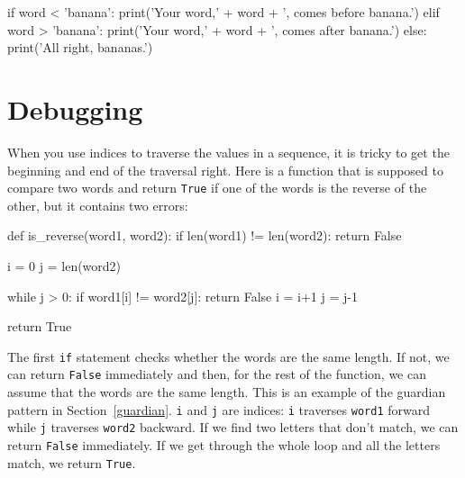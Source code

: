 \beforeverb
\begin{pycode}
if word < 'banana':
    print('Your word,' + word + ', comes before banana.')
elif word > 'banana':
    print('Your word,' + word + ', comes after banana.')
else:
    print('All right, bananas.')
\end{pycode}
\afterverb
%
%


\section{Debugging}


When you use indices to traverse the values in a sequence,
it is tricky to get the beginning and end of the traversal
right.  Here is a function that is supposed to compare two
words and return {\tt True} if one of the words is the reverse
of the other, but it contains two errors:

\beforeverb
\begin{pycode}
def is_reverse(word1, word2):
    if len(word1) != len(word2):
        return False
    
    i = 0
    j = len(word2)

    while j > 0:
        if word1[i] != word2[j]:
            return False
        i = i+1
        j = j-1

    return True
\end{pycode}
\afterverb
%
The first {\tt if} statement checks whether the words are the
same length.  If not, we can return {\tt False} immediately
and then, for the rest of the function, we can assume that the words
are the same length.  This is an example of the guardian pattern
in Section~\ref{guardian}.
%
%
{\tt i} and {\tt j} are indices: {\tt i} traverses {\tt word1}
forward while {\tt j} traverses {\tt word2} backward.  If we find
two letters that don't match, we can return {\tt False} immediately.
If we get through the whole loop and all the letters match, we
return {\tt True}.

